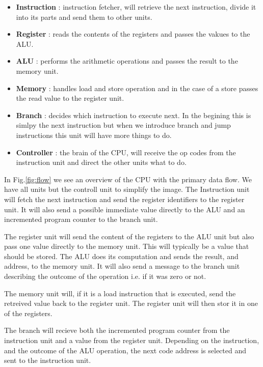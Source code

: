 \documentclass[a4paper,11pt]{article}
\begin{document}
\begin{itemize}

\item {\bf Instruction} : instruction fetcher, will retrieve the next
  instruction, divide it into its parts and send them to other units.

\item {\bf Register} : reads the contents of the registers
  and passes the vakues to the ALU.

\item {\bf ALU} : performs the arithmetic operations and passes the result to the memory unit.

\item {\bf Memory} : handles load and store operation and in the case
  of a store passes the read value to the register unit.

\item {\bf Branch} : decides which instruction to
  execute next. In the begining this is simlpy the next instruction
  but when we introduce branch and jump instructions this unit will
  have more things to do.

\item {\bf Controller} : the brain of the CPU, will receive the op
  codes from the instruction unit and direct the other units what to do.
  
\end{itemize}

In Fig.\ref{fig:flow} we see an overview of the CPU with the primary
data flow. We have all units but the controll unit to simplify the
image. The Instruction unit will fetch the next instruction and send the
register identifiers to the register unit. It will also send a
possible immediate value directly to the ALU and an incremented
program counter to the branch unit.

The register unit will send the content of the registers to the ALU
unit but also pass one value directly to the memory unit.  This will
typically be a value that should be stored. The ALU does its
computation and sends the result, and address, to the memory unit. It
will also send a message to the branch unit describing the outcome of
the operation i.e. if it was zero or not.

The memory unit will, if it is a load instruction that is executed,
send the retreived value back to the register unit. The register unit
will then stor it in one of the registers.

The branch will recieve both the incremented program counter from
the instruction unit and a value from the register unit. Depending on the
instruction, and the outcome of the ALU operation, the next code
address is selected and sent to the instruction unit.
\end{document}
